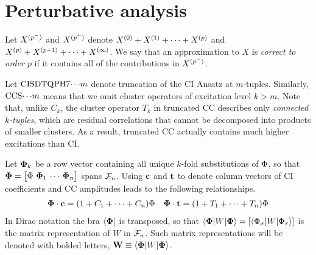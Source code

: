 \documentclass[11pt]{article}
\numberwithin{equation}{section}
\begin{document}
\setlength{\abovedisplayskip}{3pt}
\setlength{\belowdisplayskip}{3pt}



\setcounter{section}{6}
\section{Perturbative analysis}


\begin{dfn}
Let
$
  X^{(p^-)}
$
and
$
  X^{(p^+)}
$
denote
$
  X^{(0)}
+
  X^{(1)}
+
  \cdots
+
  X^{(p)}
$
and
$
  X^{(p)}
+
  X^{(p+1)}
+
  \cdots
+
  X^{(\infty)}
$.
We say that an approximation to $X$ is \textit{correct to order $p$} if it contains all of the contributions in $X^{(p^-)}$.
\end{dfn}

\begin{dfn}
Let $\mathrm{CISDTQPH7}{\cdots}m$ denote truncation of the CI Ansatz at $m$-tuples.
Similarly, $\mathrm{CCS}{\cdots}m$ means that we omit cluster operators of excitation level $k>m$.
Note that, unlike $C_k$, the cluster operator $T_k$ in truncated CC describes only \textit{connected $k$-tuples}, which are residual correlations that cannot be decomposed into products of smaller clusters.
As a result, truncated CC actually contains much higher excitations than CI.
\end{dfn}

\begin{ntt}
Let
$\bm{\F}_k$
be a row vector containing all unique $k$-fold substitutions of $\Phi $,
so that $\bm{\F}=\pma{\F\ \bm{\F}_1\,\cd\,\bm{\F}_n}$ spans $\mathcal{F}_n$.
Using $\mathbf{c}$ and $\mathbf{t}$ to denote column vectors of CI coefficients and CC amplitudes leads to the following relationships.
\begin{align}
  \mathbf{\Phi }\cdot\mathbf{c}
=
  (1 + C_1+\cdots +C_n)\Phi 
&&
  \mathbf{\Phi }\cdot\mathbf{t}
=
  (1 + T_1+\cdots +T_n)\Phi 
\end{align}
In Dirac notation the bra $\langle\mathbf{\Phi }|$ is transposed, so that
$
  \ip{\bm{\F}|W|\bm{\F}}
=
  [\ip{\F_\si|W|\F_\ta}]
$
is the matrix representation of $W$ in $\mathcal{F}_n$.
Such matrix representations will be denoted with bolded letters,
$
  \bo{W}
\equiv
  \ip{\bm{\F}|W|\bm{\F}}
$.
\end{ntt}
\end{document}
